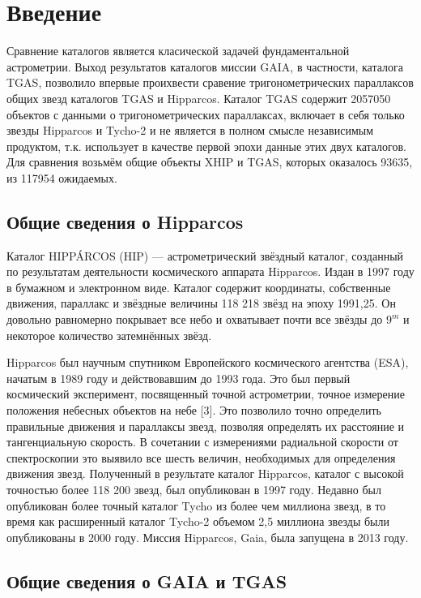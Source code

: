 \documentclass[14pt]{article} %
\begin{document}
 
\section{Введение}\label{introduction}


Сравнение каталогов является класической задачей фундаментальной астрометрии. Выход результатов каталогов миссии GAIA, в частности, каталога TGAS, позволило впервые проихвести сравение тригонометрических параллаксов общих звезд каталогов TGAS и  Hipparcos. Каталог TGAS содержит 2057050 объектов с данными о тригонометрических параллаксах, включает в себя только звезды Hipparcos и Tycho-2  и не является в полном смысле независимым продуктом, т.к. использует в качестве первой эпохи данные этих двух каталогов. Для сравнения возьмём общие объекты XHIP и TGAS, которых оказалось 93635, из 117954 ожидаемых.

\subsection{Общие сведения о Hipparcos}\label{sub:smthhip}
Каталог HIPPÁRCOS (HIP) — астрометрический звёздный каталог, созданный по результатам деятельности космического аппарата Hipparcos. Издан в 1997 году в бумажном и электронном виде. Каталог содержит координаты, собственные движения, параллакс и звёздные величины 118 218 звёзд на эпоху 1991,25. Он довольно равномерно покрывает все небо и охватывает почти все звёзды до $9^m$ и некоторое количество затемнённых звёзд.

Hipparcos был научным спутником Европейского космического агентства (ESA), начатым в 1989 году и действовавшим до 1993 года. Это был первый космический эксперимент, посвященный точной астрометрии, точное измерение положения небесных объектов на небе [3]. Это позволило точно определить правильные движения и параллаксы звезд, позволяя определять их расстояние и тангенциальную скорость. В сочетании с измерениями радиальной скорости от спектроскопии это выявило все шесть величин, необходимых для определения движения звезд. Полученный в результате каталог Hipparcos, каталог с высокой точностью более 118 200 звезд, был опубликован в 1997 году. Недавно был опубликован более точный каталог Tycho из более чем миллиона звезд, в то время как расширенный каталог Tycho-2 объемом 2,5 миллиона звезды были опубликованы в 2000 году. Миссия Hipparcos, Gaia, была запущена в 2013 году.

\subsection{Общие сведения о GAIA и TGAS}\label{sub:smthgaia}
\end{document}

